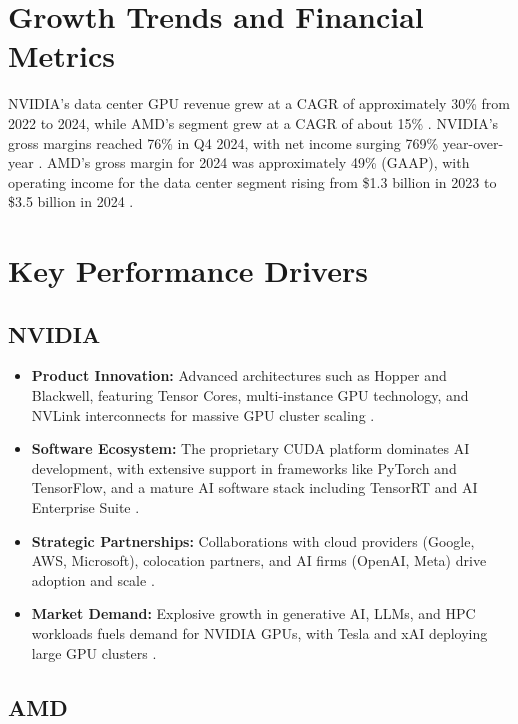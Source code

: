 \documentclass{article}
\begin{document}
\section{Growth Trends and Financial Metrics}

NVIDIA's data center GPU revenue grew at a CAGR of approximately 30\% from 2022 to 2024, while AMD's segment grew at a CAGR of about 15\% \cite{researchgate2024}. NVIDIA's gross margins reached 76\% in Q4 2024, with net income surging 769\% year-over-year \cite{nvidia2024results}. AMD's gross margin for 2024 was approximately 49\% (GAAP), with operating income for the data center segment rising from \$1.3 billion in 2023 to \$3.5 billion in 2024 \cite{amd2024annual}.

\section{Key Performance Drivers}

\subsection{NVIDIA}

\begin{itemize}
    \item \textbf{Product Innovation:} Advanced architectures such as Hopper and Blackwell, featuring Tensor Cores, multi-instance GPU technology, and NVLink interconnects for massive GPU cluster scaling \cite{nvidia_datacenter, nvidia_drivers}.
    \item \textbf{Software Ecosystem:} The proprietary CUDA platform dominates AI development, with extensive support in frameworks like PyTorch and TensorFlow, and a mature AI software stack including TensorRT and AI Enterprise Suite \cite{ainvest2024}.
    \item \textbf{Strategic Partnerships:} Collaborations with cloud providers (Google, AWS, Microsoft), colocation partners, and AI firms (OpenAI, Meta) drive adoption and scale \cite{nvidia2024results}.
    \item \textbf{Market Demand:} Explosive growth in generative AI, LLMs, and HPC workloads fuels demand for NVIDIA GPUs, with Tesla and xAI deploying large GPU clusters \cite{opentools2024}.
\end{itemize}

\subsection{AMD}
\end{document}
